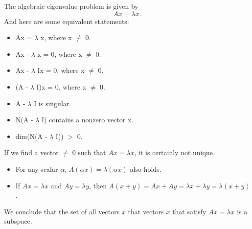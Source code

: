 \documentclass{article}
\begin{document}
The algebraic eigenvalue problem is given by \[ Ax = \lambda x.\]And here are some equivalent statements:
\begin{itemize}
\item
Ax = $\lambda$ x, where x $\neq$ 0.
\item
Ax - $\lambda$ x = 0, where x $\neq$ 0.
\item
Ax - $\lambda$ Ix = 0, where x $\neq$ 0.
\item
(A - $\lambda$ I)x = 0, where x $\neq$ 0.
\item
A - $\lambda$ I is singular.
\item
N(A - $\lambda$ I) contains a nonzero vector x.
\item
dim(N(A - $\lambda$ I)) $>$ 0.
\end{itemize}
If we find a vector $\neq$ 0 such that $Ax = \lambda x$, it is certainly not unique.
\begin{itemize}
\item
For any scalar $\alpha$, $A(\alpha x) = \lambda(\alpha x)$ also holds.
\item
If $Ax = \lambda x$ and $Ay = \lambda y$, then $A(x+y) = Ax + Ay = \lambda x + \lambda y = \lambda(x+y)$.
\end{itemize}
We conclude that the set of all vectors $x$ that vectors $x$ that satisfy $Ax = \lambda x$ is a subspace.

\end{document}
